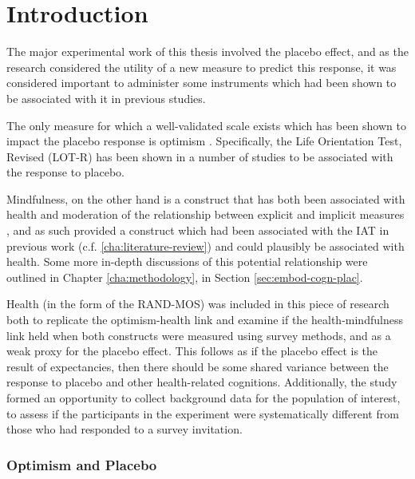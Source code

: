 \documentclass{article}
\begin{document}
\part{Introduction}
\label{sec:introduction}


The major experimental work of this thesis involved the placebo effect, and as the research considered the utility of a new measure to predict this response, it was considered important to administer some instruments which had been shown to be associated with it in previous studies.

The only measure for which a well-validated scale exists which has been shown to impact the placebo response is optimism \cite{Geers2005,morton2009reproducibility}. Specifically, the Life Orientation Test, Revised (LOT-R) has been shown in a number of studies to be associated with the response to placebo. 

Mindfulness, on the other hand is a construct that has both been associated with health \cite{Carmody2008} and moderation  of the relationship between explicit and implicit measures \cite{Levesque2007}, and as such provided a construct which had been associated with the IAT in previous work (c.f. \ref{cha:literature-review}) and could plausibly be associated with health. Some more in-depth discussions of this potential relationship were outlined in Chapter \ref{cha:methodology}, in Section \ref{sec:embod-cogn-plac}. 

Health (in the form of the RAND-MOS) was included in this piece of research both to replicate the optimism-health link and examine if the health-mindfulness link held when both constructs were measured using survey methods, and as a weak proxy for the placebo effect. This follows as if the placebo effect is the result of expectancies, then there should be some shared variance between the response to placebo and other health-related cognitions. Additionally, the study formed an opportunity to collect background data for the population of interest, to assess if the participants in the experiment were systematically different from those who had responded to a survey invitation. 


\section{Optimism and Placebo}
\label{sec:optimism}
\end{document}

